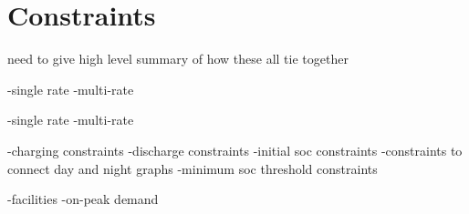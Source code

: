 \section{Constraints}
need to give high level summary of how these all tie together

    -single rate
    -multi-rate

    -single rate
    -multi-rate

    -charging constraints
    -discharge constraints
    -initial soc constraints
    -constraints to connect day and night graphs
    -minimum soc threshold constraints 

    -facilities
    -on-peak demand


